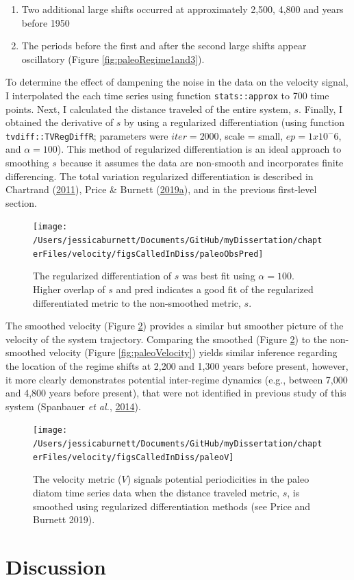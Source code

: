 \documentclass[12pt,twoside,openany]{reedthesis}
\providecommand{\tightlist}{%
  \setlength{\itemsep}{0pt}\setlength{\parskip}{0pt}}
\begin{document}
\begin{enumerate}
\def\labelenumi{\arabic{enumi}.}
\tightlist
\item
  Two additional large shifts occurred at approximately 2,500, 4,800 and years before 1950\\
\item
  The periods before the first and after the second large shifts appear oscillatory (Figure \ref{fig:paleoRegime1and3}).
\end{enumerate}
To determine the effect of dampening the noise in the data on the velocity signal, I interpolated the each time series using function \texttt{stats::approx} to 700 time points. Next, I calculated the distance traveled of the entire system, \(s\). Finally, I obtained the derivative of \(s\) by using a regularized differentiation (using function \texttt{tvdiff::TVRegDiffR}; parameters were \(iter = 2000\), scale = small, \(ep = 1 x 10^-6\), and \(\alpha = 100\)). This method of regularized differentiation is an ideal approach to smoothing \(s\) because it assumes the data are non-smooth and incorporates finite differencing. The total variation regularized differentiation is described in Chartrand (\protect\hyperlink{ref-chartrand2011numerical}{2011}), Price \& Burnett (\protect\hyperlink{ref-price2019tvdiff}{2019}\protect\hyperlink{ref-price2019tvdiff}{a}), and in the previous first-level section.
\begin{figure}
\texttt{[image: /Users/jessicaburnett/Documents/GitHub/myDissertation/chapterFiles/velocity/figsCalledInDiss/paleoObsPred]} \caption{The regularized differentiation of $s$ was best fit using $\alpha = 100$. Higher overlap of $s$ and pred indicates a good fit of the regularized differentiated metric to the non-smoothed metric, $s$.}\label{fig:paleoObsPred}
\end{figure}
The smoothed velocity (Figure \ref{fig:paleoV}) provides a similar but smoother picture of the velocity of the system trajectory. Comparing the smoothed (Figure \ref{fig:paleoV}) to the non-smoothed velocity (Figure \ref{fig:paleoVelocity}) yields similar inference regarding the location of the regime shifts at 2,200 and 1,300 years before present, however, it more clearly demonstrates potential inter-regime dynamics (e.g., between 7,000 and 4,800 years before present), that were not identified in previous study of this system (Spanbauer \emph{et al.}, \protect\hyperlink{ref-spanbauer_prolonged_2014}{2014}).
\begin{figure}
\texttt{[image: /Users/jessicaburnett/Documents/GitHub/myDissertation/chapterFiles/velocity/figsCalledInDiss/paleoV]} \caption{The velocity metric  ($V$) signals potential periodicities in the paleo diatom time series data when the distance traveled metric, $s$, is smoothed using regularized differentiation methods (see Price and Burnett 2019).}\label{fig:paleoV}
\end{figure}
\hypertarget{discussion-3}{%
\section{Discussion}\label{discussion-3}}
\end{document}
